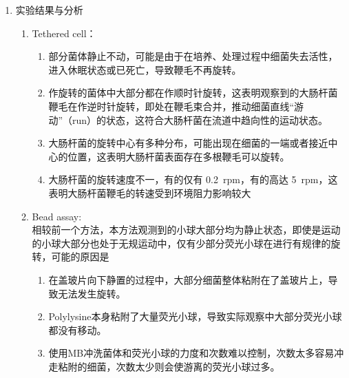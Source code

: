 \documentclass[a4paper]{article}
\begin{document}
\begin{enumerate}[label=\chinese*.,left=0pt]
    
    \item 实验结果与分析
    \begin{enumerate}[label = \arabic*., left = 0pt]
        \item Tethered cell：
        \begin{enumerate}[label = 1.\arabic*., left =0pt]
            \item 部分菌体静⽌不动，可能是由于在培养、处理过程中细菌失去活性，进⼊休眠状态或已死亡，导致鞭⽑不再旋转。
            \item 作旋转的菌体中大部分都在作顺时针旋转，这表明观察到的大肠杆菌鞭毛在作逆时针旋转，即处在鞭毛束合并，推动细菌直线“游动”（run）的状态，这符合大肠杆菌在流道中趋向性的运动状态。
            \item 大肠杆菌的旋转中心有多种分布，可能出现在细菌的一端或者接近中心的位置，这表明大肠杆菌表面存在多根鞭毛可以旋转。
            \item 大肠杆菌的旋转速度不一，有的仅有 \qty{0.2}{rpm}，有的高达 \qty{5}{rpm}，这表明大肠杆菌鞭毛的转速受到环境阻力影响较大            
        \end{enumerate}
        \item Bead assay:
        \\
        相较前一个方法，本方法观测到的小球大部分均为静止状态，即使是运动的小球大部分也处于无规运动中，仅有少部分荧光小球在进行有规律的旋转，可能的原因是
        \begin{enumerate}
            \item 在盖玻片向下静置的过程中，大部分细菌整体粘附在了盖玻片上，导致无法发生旋转。
            \item Polylysine本身粘附了大量荧光小球，导致实际观察中大部分荧光小球都没有移动。
            \item 使用MB冲洗菌体和荧光小球的力度和次数难以控制，次数太多容易冲走粘附的细菌，次数太少则会使游离的荧光小球过多。
            
        \end{enumerate}

    \end{enumerate}



\end{enumerate}
\end{document}
